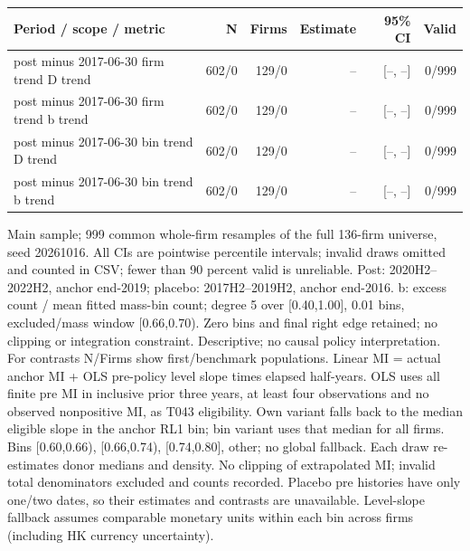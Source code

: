 \begin{threeparttable}
\begin{tabular}{p{6.0cm}rrrrr}
\toprule
Period / scope / metric & N & Firms & Estimate & 95\% CI & Valid \\
\midrule
post minus 2017-06-30 firm trend D trend & 602/0 & 129/0 & -- & [--, --] & 0/999 \\
post minus 2017-06-30 firm trend b trend & 602/0 & 129/0 & -- & [--, --] & 0/999 \\
post minus 2017-06-30 bin trend D trend & 602/0 & 129/0 & -- & [--, --] & 0/999 \\
post minus 2017-06-30 bin trend b trend & 602/0 & 129/0 & -- & [--, --] & 0/999 \\
\bottomrule
\end{tabular}
\begin{tablenotes}[flushleft]\footnotesize
\item[] Main sample; 999 common whole-firm resamples of the full 136-firm universe, seed 20261016. All CIs are pointwise percentile intervals; invalid draws omitted and counted in CSV; fewer than 90 percent valid is unreliable. Post: 2020H2--2022H2, anchor end-2019; placebo: 2017H2--2019H2, anchor end-2016. b: excess count / mean fitted mass-bin count; degree 5 over [0.40,1.00], 0.01 bins, excluded/mass window [0.66,0.70). Zero bins and final right edge retained; no clipping or integration constraint. Descriptive; no causal policy interpretation. For contrasts N/Firms show first/benchmark populations. Linear MI = actual anchor MI + OLS pre-policy level slope times elapsed half-years. OLS uses all finite pre MI in inclusive prior three years, at least four observations and no observed nonpositive MI, as T043 eligibility. Own variant falls back to the median eligible slope in the anchor RL1 bin; bin variant uses that median for all firms. Bins [0.60,0.66), [0.66,0.74), [0.74,0.80], other; no global fallback. Each draw re-estimates donor medians and density. No clipping of extrapolated MI; invalid total denominators excluded and counts recorded. Placebo pre histories have only one/two dates, so their estimates and contrasts are unavailable. Level-slope fallback assumes comparable monetary units within each bin across firms (including HK currency uncertainty).
\end{tablenotes}
\end{threeparttable}
\endgroup
\par\medskip
